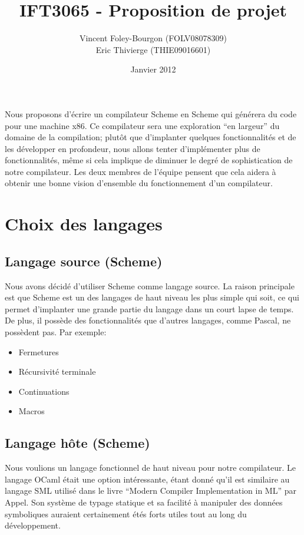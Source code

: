 \documentclass[11pt]{article}
\begin{document}
\title{IFT3065 - Proposition de projet}
\date{Janvier 2012}
\author{Vincent Foley-Bourgon (FOLV08078309) \\
Eric Thivierge (THIE09016601)}
\maketitle

\abstract

Nous proposons d'écrire un compilateur Scheme en Scheme qui générera
du code pour une machine x86.  Ce compilateur sera une exploration
``en largeur'' du domaine de la compilation; plutôt que d'implanter
quelques fonctionnalités et de les développer en profondeur, nous
allons tenter d'implémenter plus de fonctionnalités, même si cela
implique de diminuer le degré de sophistication de notre compilateur.
Les deux membres de l'équipe pensent que cela aidera à obtenir une
bonne vision d'ensemble du fonctionnement d'un compilateur.

\section{Choix des langages}

\subsection{Langage source (Scheme)}

Nous avons décidé d'utiliser Scheme comme langage source.  La raison
principale est que Scheme est un des langages de haut niveau les plus
simple qui soit, ce qui permet d'implanter une grande partie du
langage dans un court lapse de temps.  De plus, il possède des
fonctionnalités que d'autres langages, comme Pascal, ne possèdent
pas. Par exemple:

\begin{itemize}
\item Fermetures
\item Récursivité terminale
\item Continuations
\item Macros
\end{itemize}


\subsection{Langage hôte (Scheme)}

Nous voulions un langage fonctionnel de haut niveau pour notre
compilateur.  Le langage OCaml était une option intéressante, étant
donné qu'il est similaire au langage SML utilisé dans le livre
``Modern Compiler Implementation in ML'' par Appel.  Son système de
typage statique et sa facilité à manipuler des données symboliques
auraient certainement étés forts utiles tout au long du développement.
\end{document}
